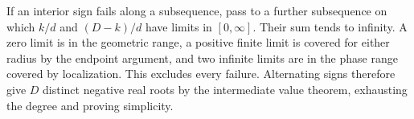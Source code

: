 If an interior sign fails along a subsequence, pass to a further subsequence on which $k/d$ and $(D-k)/d$ have limits in $[0,\infty]$. Their sum tends to infinity. A zero limit is in the geometric range, a positive finite limit is covered for either radius by the endpoint argument, and two infinite limits are in the phase range covered by localization. This excludes every failure. Alternating signs therefore give $D$ distinct negative real roots by the intermediate value theorem, exhausting the degree and proving simplicity.

